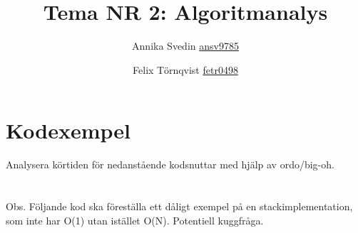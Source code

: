 \documentclass[a5paper,10pt,oneside]{article}
\title{Tema NR 2: Algoritmanalys}
\author{Annika Svedin \url{ansv9785} \and Felix Törnqvist \url{fetr0498}}
\begin{document}
\maketitle

\section*{Kodexempel}

Analysera körtiden för nedanstående kodsnuttar med hjälp av ordo/big-oh.

\section{}




\section{}



\section{}
Obs. 
Följande kod ska föreställa ett dåligt exempel på en stackimplementation, som inte har O(1) utan istället O(N). Potentiell kuggfråga.



\section{}

\end{document}
